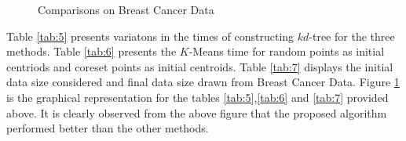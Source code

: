 \documentclass[runningheads]{llncs}
\begin{document}
\begin{figure}[!hbt]
	\hspace{0mm}
	\centering
	\hspace{0mm}
	\caption{Comparisons on Breast Cancer Data }
	\label{fig:3}     
\end{figure}
Table \ref{tab:5} presents variatons in the times of constructing $kd$-tree for the three methods. Table \ref{tab:6} presents the $K$-Means time for random points as initial centriods and coreset points as initial centroids. Table \ref{tab:7} displays the initial data size considered and final data size drawn from Breast Cancer Data. Figure \ref{fig:3} is the graphical representation for the tables \ref{tab:5},\ref{tab:6} and \ref{tab:7} provided above. It is clearly observed from the above figure that the proposed algorithm performed better than the other methods. 
\end{document}
